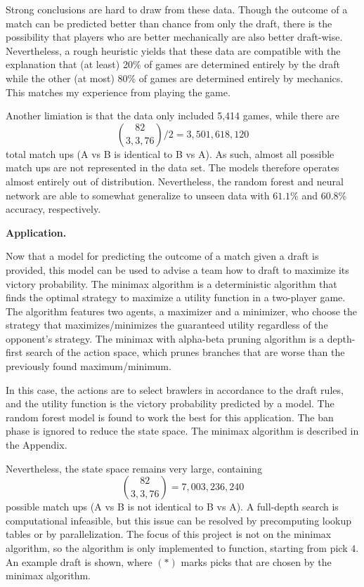 \documentclass[12pt]{article}
\begin{document}
Strong conclusions are hard to draw from these data. Though the outcome of a match can be predicted better than chance from only the draft, there is the possibility that players who are better mechanically are also better draft-wise. Nevertheless, a rough heuristic yields that these data are compatible with the explanation that (at least) 20\% of games are determined entirely by the draft while the other (at most) 80\% of games are determined entirely by mechanics. This matches my experience from playing the game.

Another limiation is that the data only included 5,414 games, while there are 
$$\binom{82}{3,3,76} \big/ 2 = 3,501,618,120$$
total match ups (A vs B is identical to B vs A). As such, almost all possible match ups are not represented in the data set. The models therefore operates almost entirely out of distribution. Nevertheless, the random forest and neural network are able to somewhat generalize to unseen data with $61.1\%$ and $60.8\%$ accuracy, respectively.

\textbf{Application.} 

Now that a model for predicting the outcome of a match given a draft is provided, this model can be used to advise a team how to draft to maximize its victory probability. The minimax algorithm is a deterministic algorithm that finds the optimal strategy to maximize a utility function in a two-player game. The algorithm features two agents, a maximizer and a minimizer, who choose the strategy that maximizes/minimizes the guaranteed utility regardless of the opponent's strategy. The minimax with alpha-beta pruning algorithm is a depth-first search of the action space, which prunes branches that are worse than the previously found maximum/minimum.

In this case, the actions are to select brawlers in accordance to the draft rules, and the utility function is the victory probability predicted by a model. The random forest model is found to work the best for this application. The ban phase is ignored to reduce the state space. The minimax algorithm is described in the Appendix.

Nevertheless, the state space remains very large, containing 
$$\binom{82}{3,3,76} = 7,003,236,240$$
possible match ups (A vs B is not identical to B vs A). A full-depth search is computational infeasible, but this issue can be resolved by precomputing lookup tables or by parallelization. The focus of this project is not on the minimax algorithm, so the algorithm is only implemented to function, starting from pick $4$. An example draft is shown, where $(*)$ marks picks that are chosen by the minimax algorithm.
\end{document}
